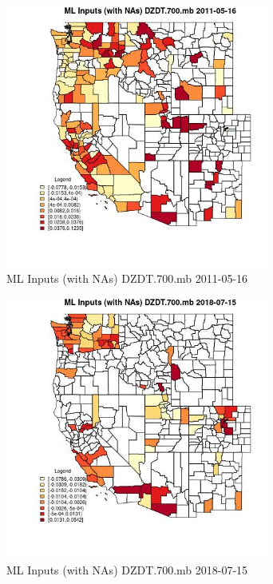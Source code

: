 \begin{figure} 
\centering  
\includegraphics[width=0.77\textwidth]{Code_Outputs/Report_ML_input_PM25_Step4_part_e_de_duplicated_aves_compiled_2019-05-20wNAs_CountyDZDT700mbMean2011-05-16.jpg} 
\caption{\label{fig:Report_ML_input_PM25_Step4_part_e_de_duplicated_aves_compiled_2019-05-20wNAsCountyDZDT700mbMean2011-05-16}ML Inputs (with NAs) DZDT.700.mb 2011-05-16} 
\end{figure} 
 

\begin{figure} 
\centering  
\includegraphics[width=0.77\textwidth]{Code_Outputs/Report_ML_input_PM25_Step4_part_e_de_duplicated_aves_compiled_2019-05-20wNAs_CountyDZDT700mbMean2018-07-15.jpg} 
\caption{\label{fig:Report_ML_input_PM25_Step4_part_e_de_duplicated_aves_compiled_2019-05-20wNAsCountyDZDT700mbMean2018-07-15}ML Inputs (with NAs) DZDT.700.mb 2018-07-15} 
\end{figure} 
 

